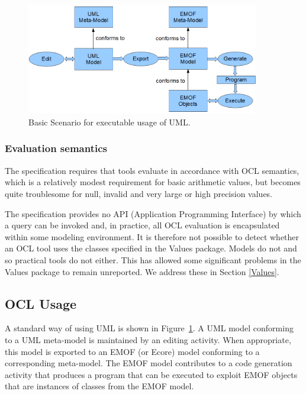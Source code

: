 \documentclass{eceasst}
\begin{document}
\begin{figure}
  \begin{center}
    \includegraphics[width=4.0in]{BasicScenario.png}
  \end{center}
  \caption{Basic Scenario for executable usage of UML.}
  \label{fig:BasicScenario}
\end{figure}

\subsubsection{Evaluation semantics}

The specification requires that tools evaluate in accordance with OCL semantics, which is a relatively modest requirement for basic arithmetic values, but becomes quite troublesome for null, invalid and very large or high precision values.

The specification provides no API (Application Programming Interface) by which a query can be invoked and, in practice, all OCL evaluation is encapsulated within some modeling environment. It is therefore not possible to detect whether an OCL tool uses the classes specified in the Values package. Models do not and so practical tools do not either. This has allowed some significant problems in the Values package to remain unreported. We address these in Section \ref{Values}.
 
\subsection{OCL Usage}

A standard way of using UML is shown in Figure~\ref{fig:BasicScenario}. A UML model conforming to a UML meta-model is maintained by an editing activity. When appropriate, this model is exported to an EMOF (or Ecore) model conforming to a corresponding meta-model. The EMOF model contributes to a code generation activity that produces a program that can be executed to exploit EMOF objects that are instances of classes from the EMOF model.
\end{document}
